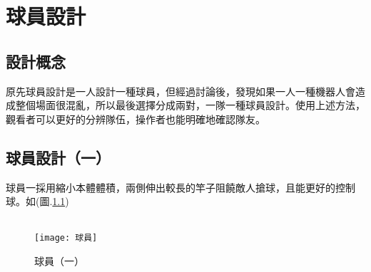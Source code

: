 \chapter{球員設計}
\section{設計概念}
    原先球員設計是一人設計一種球員，但經過討論後，發現如果一人一種機器人會造成整個場面很混亂，所以最後選擇分成兩對，一隊一種球員設計。使用上述方法，觀看者可以更好的分辨隊伍，操作者也能明確地確認隊友。\\[6pt]

\section{球員設計（一）}
    球員一採用縮小本體體積，兩側伸出較長的竿子阻饒敵人搶球，且能更好的控制球。如(圖.\ref{球員})\\[6pt]\\
\begin{figure}[hbt!]
\center
\texttt{[image: 球員]}
\caption{\Large 球員（一）}
\label{球員}
\end{figure}